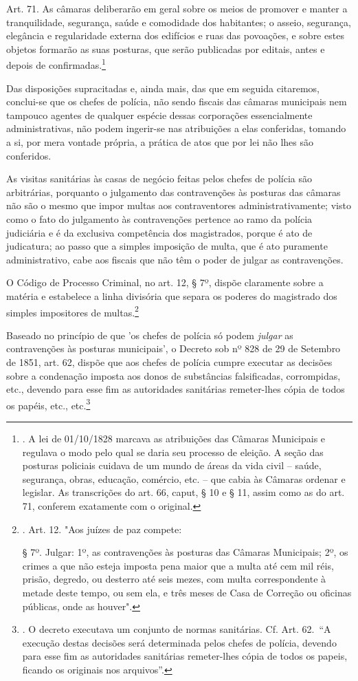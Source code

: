 Art. 71. As câmaras deliberarão em geral sobre os meios de promover e
manter a tranquilidade, segurança, saúde e comodidade dos habitantes; o
asseio, segurança, elegância e regularidade externa dos edifícios e ruas
das povoações, e sobre estes objetos formarão as suas posturas, que
serão publicadas por editais, antes e depois de confirmadas.\footnote{.
  A lei de 01/10/1828 marcava as atribuições das Câmaras Municipais e
  regulava o modo pelo qual se daria seu processo de eleição. A seção
  das posturas policiais cuidava de um mundo de áreas da vida civil --
  saúde, segurança, obras, educação, comércio, etc. -- que cabia às
  Câmaras ordenar e legislar. As transcrições do art. 66, caput, § 10 e
  § 11, assim como as do art. 71, conferem exatamente com o original.}

Das disposições supracitadas e, ainda mais, das que em seguida
citaremos, conclui-se que os chefes de polícia, não sendo fiscais das
câmaras municipais nem tampouco agentes de qualquer espécie dessas
corporações essencialmente administrativas, não podem ingerir-se nas
atribuições a elas conferidas, tomando a si, por mera vontade própria, a
prática de atos que por lei não lhes são conferidos.

As visitas sanitárias às casas de negócio feitas pelos chefes de polícia
são arbitrárias, porquanto o julgamento das contravenções às posturas
das câmaras não são o mesmo que impor multas aos contraventores
administrativamente; visto como o fato do julgamento às contravenções
pertence ao ramo da polícia judiciária e é da exclusiva competência dos
magistrados, porque é ato de judicatura; ao passo que a simples
imposição de multa, que é ato puramente administrativo, cabe aos fiscais
que não têm o poder de julgar as contravenções.

O Código de Processo Criminal, no art. 12, § 7º, dispõe claramente sobre
a matéria e estabelece a linha divisória que separa os poderes do
magistrado dos simples impositores de multas.\footnote{. Art. 12. "Aos
  juízes de paz compete:

  § 7º. Julgar: 1º, as contravenções às posturas das Câmaras Municipais;
  2º, os crimes a que não esteja imposta pena maior que a multa até cem
  mil réis, prisão, degredo, ou desterro até seis mezes, com multa
  correspondente à metade deste tempo, ou sem ela, e três meses de Casa
  de Correção ou oficinas públicas, onde as houver".}

Baseado no princípio de que 'os chefes de polícia só podem \emph{julgar}
as contravenções às posturas municipais', o Decreto sob nº 828 de 29 de
Setembro de 1851, art. 62, dispõe que aos chefes de polícia cumpre
executar as decisões sobre a condenação imposta aos donos de substâncias
falsificadas, corrompidas, etc., devendo para esse fim as autoridades
sanitárias remeter-lhes cópia de todos os papéis, etc., etc.\footnote{.
  O decreto executava um conjunto de normas sanitárias. Cf. Art. 62.~``A
  execução destas decisões será determinada pelos chefes de polícia,
  devendo para esse fim as autoridades sanitárias remeter-lhes cópia de
  todos os papeis, ficando os originais nos arquivos''.}

